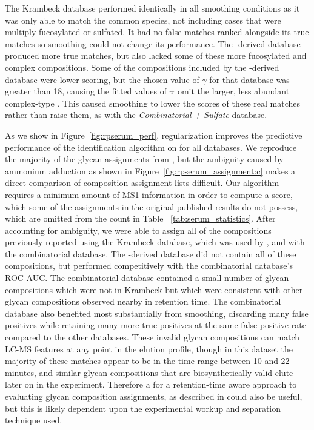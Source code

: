     The Krambeck database performed identically in all smoothing conditions as it
    was only able to match the common species, not including cases that were multiply
    fucosylated or sulfated. It had no false matches ranked alongside its true matches so
    smoothing could not change its performance. The \glyspace-derived database produced more true
    matches, but also lacked some of these more fucosylated and complex compositions. Some of the
    compositions included by the \glyspace-derived database were lower scoring, but the chosen
    value of $\gamma$ for that database was greater than 18, causing the fitted values of $\mathbf{\tau}$
    omit the larger, less abundant complex-type \nglycans. This caused smoothing to lower the scores
    of these real matches rather than raise them, as with the \textit{Combinatorial + Sulfate} database.

    As we show in Figure~\ref{fig:rpserum_perf}, regularization improves the
    predictive performance of the identification algorithm on \rpserum for all databases. 
    We reproduce the majority of the glycan assignments from \cite{Yu2013}, but the ambiguity
    caused by ammonium adduction as shown in Figure~\ref{fig:rpserum_assignment:c} makes a
    direct comparison of composition assignment lists difficult. Our algorithm requires a minimum
    amount of MS1 information in order to compute a score, which some of the assignments in the
    original published results do not possess, which are omitted from the count in Table~
    \ref{tab:serum_statistics}. After accounting for ambiguity, we were able to assign all
    of the compositions previously reported using the Krambeck database, which was used
    by \cite{Yu2013}, and with the combinatorial database. The \glyspace-derived database did not
    contain all of these compositions, but performed competitively with the combinatorial
    database's ROC AUC. The combinatorial database contained a small number of glycan compositions
    which were not in Krambeck but which were consistent with other glycan compositions
    observed nearby in retention time. The combinatorial database also benefited most
    substantially from smoothing, discarding many false positives while retaining many more
    true positives at the same false positive rate compared to the other databases. These
    invalid glycan compositions can match LC-MS features at any point in the elution profile,
    though in this dataset the majority of these matches appear to be in the time range between
    10 and 22 minutes, and similar glycan compositions that are biosynthetically valid elute
    later on in the experiment. Therefore a for a retention-time aware approach to evaluating glycan
    composition assignments, as described in \cite{Hu2016} could also be useful, but this is
    likely dependent upon the experimental workup and separation technique used.

